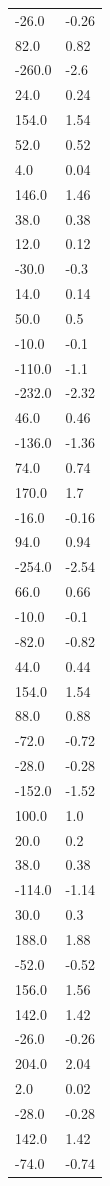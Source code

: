 \begin{longtable}{ll}
-26.0 & -0.26 \\
82.0 & 0.82 \\
-260.0 & -2.6 \\
24.0 & 0.24 \\
154.0 & 1.54 \\
52.0 & 0.52 \\
4.0 & 0.04 \\
146.0 & 1.46 \\
38.0 & 0.38 \\
12.0 & 0.12 \\
-30.0 & -0.3 \\
14.0 & 0.14 \\
50.0 & 0.5 \\
-10.0 & -0.1 \\
-110.0 & -1.1 \\
-232.0 & -2.32 \\
46.0 & 0.46 \\
-136.0 & -1.36 \\
74.0 & 0.74 \\
170.0 & 1.7 \\
-16.0 & -0.16 \\
94.0 & 0.94 \\
-254.0 & -2.54 \\
66.0 & 0.66 \\
-10.0 & -0.1 \\
-82.0 & -0.82 \\
44.0 & 0.44 \\
154.0 & 1.54 \\
88.0 & 0.88 \\
-72.0 & -0.72 \\
-28.0 & -0.28 \\
-152.0 & -1.52 \\
100.0 & 1.0 \\
20.0 & 0.2 \\
38.0 & 0.38 \\
-114.0 & -1.14 \\
30.0 & 0.3 \\
188.0 & 1.88 \\
-52.0 & -0.52 \\
156.0 & 1.56 \\
142.0 & 1.42 \\
-26.0 & -0.26 \\
204.0 & 2.04 \\
2.0 & 0.02 \\
-28.0 & -0.28 \\
142.0 & 1.42 \\
-74.0 & -0.74 \\

\end{longtable}
